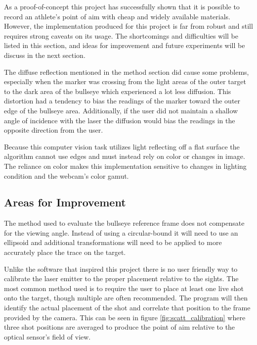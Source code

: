 \documentclass[conference]{IEEEtran}
\begin{document}
As a proof-of-concept this project has successfully shown that it is possible to record an athlete's point of aim with cheap and widely available materials.
However, the implementation produced for this project is far from robust and still requires strong caveats on its usage.
The shortcomings and difficulties will be listed in this section, 
and ideas for improvement and future experiments will be discuss in the next section.

The diffuse reflection mentioned in the method section did cause some problems, especially when the marker was crossing from the light areas of the outer target to the dark area of the bullseye which experienced a lot less diffusion.
This distortion had a tendency to bias the readings of the marker toward the outer edge of the bullseye area.
Additionally, if the user did not maintain a shallow angle of incidence with the laser the diffusion would bias the readings in the opposite direction from the user.

Because this computer vision task utilizes light reflecting off a flat surface the algorithm cannot use edges and must instead rely on color or changes in image.
The reliance on color makes this implementation sensitive to changes in lighting condition and the webcam's color gamut.


\subsection{Areas for Improvement}

The method used to evaluate the bullseye reference frame does not compensate for the viewing angle. Instead of using a circular-bound it will need to use an ellipsoid and additional transformations will need to be applied to more accurately place the trace on the target.

Unlike the software that inspired this project there is no user friendly way to calibrate the laser emitter to the proper placement relative to the sights.
The most common method used is to require the user to place at least one live shot onto the target, though multiple are often recommended.
The program will then identify the actual placement of the shot and correlate that position to the frame provided by the camera.
This can be seen in figure \ref{fig:scatt_calibration} where three shot positions are averaged to produce the point of aim relative to the optical sensor's field of view.
\end{document}
